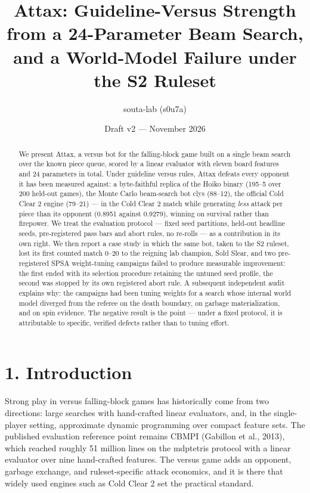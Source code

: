 \documentclass[
  11pt,
]{article}
\title{Attax: Guideline-Versus Strength from a 24-Parameter Beam Search,
and a World-Model Failure under the S2 Ruleset}
\author{souta-lab (s0u7a)}
\date{Draft v2 --- November 2026}
\begin{document}
\maketitle
\begin{abstract}
We present Attax, a versus bot for the falling-block game built on a
single beam search over the known piece queue, scored by a linear
evaluator with eleven board features and 24 parameters in total. Under
guideline versus rules, Attax defeats every opponent it has been
measured against: a byte-faithful replica of the Hoiko binary (195--5
over 200 held-out games), the Monte Carlo beam-search bot clys (88--12),
the official Cold Clear 2 engine (79--21) --- in the Cold Clear 2 match
while generating \emph{less} attack per piece than its opponent (0.8951
against 0.9279), winning on survival rather than firepower. We treat the
evaluation protocol --- fixed seed partitions, held-out headline seeds,
pre-registered pass bars and abort rules, no re-rolls --- as a
contribution in its own right. We then report a case study in which the
same bot, taken to the S2 ruleset, lost its first counted match 0--20 to
the reigning lab champion, Sold Slear, and two pre-registered SPSA
weight-tuning campaigns failed to produce measurable improvement: the
first ended with its selection procedure retaining the untuned seed
profile, the second was stopped by its own registered abort rule. A
subsequent independent audit explains why: the campaigns had been tuning
weights for a search whose internal world model diverged from the
referee on the death boundary, on garbage materialization, and on spin
evidence. The negative result is the point --- under a fixed protocol,
it is attributable to specific, verified defects rather than to tuning
effort.
\end{abstract}

\section{1. Introduction}\label{introduction}

Strong play in versus falling-block games has historically come from two
directions: large searches with hand-crafted linear evaluators, and, in
the single-player setting, approximate dynamic programming over compact
feature sets. The published evaluation reference point remains CBMPI
(Gabillon et al., 2013), which reached roughly 51 million lines on the
mdptetris protocol with a linear evaluator over nine hand-crafted
features. The versus game adds an opponent, garbage exchange, and
ruleset-specific attack economics, and it is there that widely used
engines such as Cold Clear 2 set the practical standard.
\end{document}
